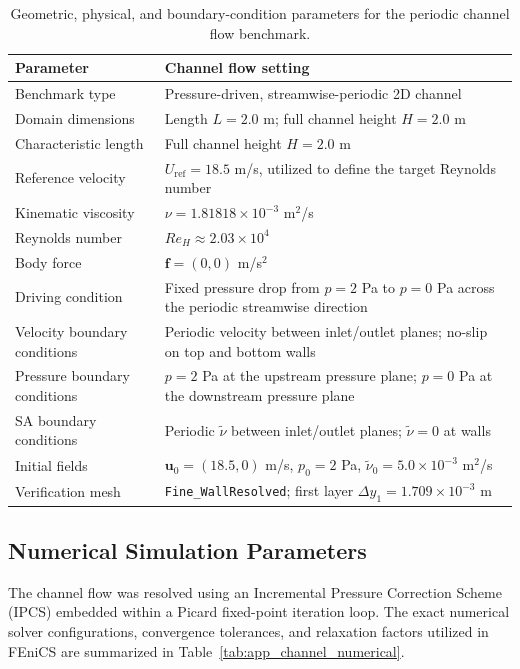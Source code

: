 \begin{table}[htbp]
	\centering
	\footnotesize
	\caption{Geometric, physical, and boundary-condition parameters for the periodic channel flow benchmark.}
	\label{tab:app_channel_physical}
	\renewcommand{\arraystretch}{1.2}
	\begin{tabularx}{\textwidth}{l X}
		\hline
		\textbf{Parameter} & \textbf{Channel flow setting} \\
		\hline
		Benchmark type & Pressure-driven, streamwise-periodic 2D channel \\
		Domain dimensions & Length $L=2.0$ m; full channel height $H=2.0$ m \\
		Characteristic length & Full channel height $H=2.0$ m \\
		Reference velocity & $U_{\mathrm{ref}}=18.5$ m/s, utilized to define the target Reynolds number \\
		Kinematic viscosity & $\nu = 1.81818 \times 10^{-3}$ m$^2$/s \\
		Reynolds number & $Re_H \approx 2.03 \times 10^4$ \\
		Body force & $\mathbf{f}=(0,0)$ m/s$^2$ \\
		Driving condition & Fixed pressure drop from $p=2$ Pa to $p=0$ Pa across the periodic streamwise direction \\
		Velocity boundary conditions & Periodic velocity between inlet/outlet planes; no-slip on top and bottom walls \\
		Pressure boundary conditions & $p=2$ Pa at the upstream pressure plane; $p=0$ Pa at the downstream pressure plane \\
		SA boundary conditions & Periodic $\tilde{\nu}$ between inlet/outlet planes; $\tilde{\nu}=0$ at walls \\
		Initial fields & $\mathbf{u}_0=(18.5,0)$ m/s, $p_0=2$ Pa, $\tilde{\nu}_0=5.0 \times 10^{-3}$ m$^2$/s \\
		Verification mesh & \texttt{Fine\_WallResolved}; first layer $\Delta y_1 = 1.709 \times 10^{-3}$ m \\
		\hline
	\end{tabularx}
\end{table}

\subsection{Numerical Simulation Parameters}
\label{subsec:app_channel_numerical}
The channel flow was resolved using an Incremental Pressure Correction Scheme (IPCS) embedded within a Picard fixed-point iteration loop. The exact numerical solver configurations, convergence tolerances, and relaxation factors utilized in FEniCS are summarized in Table~\ref{tab:app_channel_numerical}.

